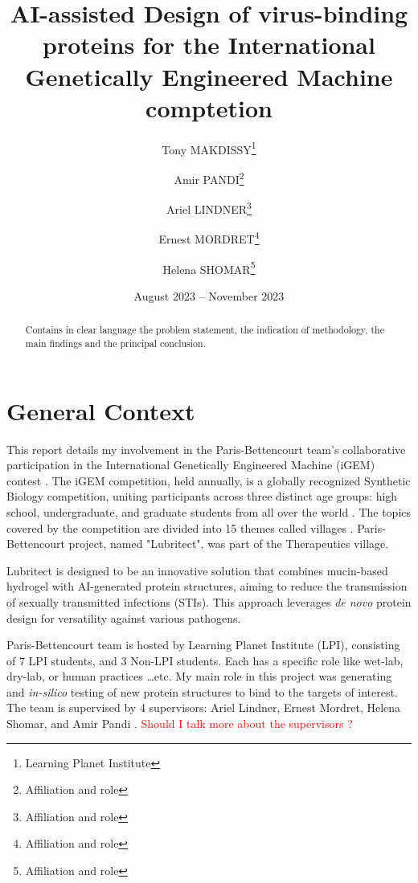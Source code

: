 \documentclass[11pt,a4paper]{article}
\begin{document}
\title{AI-assisted Design of virus-binding proteins for the International Genetically Engineered Machine comptetion}
\author{Tony MAKDISSY\thanks{Learning Planet Institute} \and 
Amir PANDI\thanks{Affiliation and role} \and 
Ariel LINDNER\thanks{Affiliation and role} \and
Ernest MORDRET\thanks{Affiliation and role} \and
Helena SHOMAR\thanks{Affiliation and role}}




\date{August 2023 -- November 2023}
\maketitle

\begin{abstract}
    Contains in clear language the problem statement, the indication of methodology, the main findings and the principal conclusion.
\end{abstract}

\section{General Context}

This report details my involvement in the Paris-Bettencourt team's 
collaborative participation in the International Genetically Engineered 
Machine (iGEM) contest \cite{igem_main}. The iGEM competition, held annually, 
is a globally recognized Synthetic Biology competition, uniting 
participants across three distinct age groups: high school, 
undergraduate, and graduate students from all over the world
\cite{igem_description}.
The topics covered by the competition are divided into 15 themes called villages \cite{igem_villages}.
Paris-Bettencourt project, named "Lubritect", was part of the Therapeutics village.

Lubritect is designed to be an innovative solution that combines 
mucin-based hydrogel with AI-generated protein structures, aiming to 
reduce the transmission of sexually transmitted infections (STIs). This 
approach leverages \emph{de novo} protein design for versatility against 
various pathogens. 

Paris-Bettencourt team is hosted by Learning Planet Institute (LPI),
consisting of 7 LPI students, and 3 Non-LPI students.
Each has a specific role like wet-lab, dry-lab, or human practices \ldots etc. 
My main role in this project was generating and \emph{in-silico} testing of new protein structures to bind to the targets of interest.
The team is supervised by 4 supervisors: Ariel Lindner, Ernest Mordret, Helena 
Shomar, and Amir Pandi \cite{paris_bettencourt_team}.
\textcolor{red}{Should I talk more about the supervisors ?}
\end{document}
